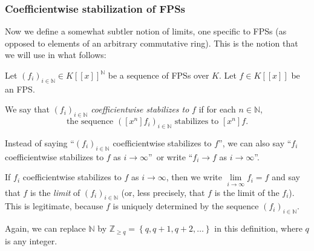 \subsubsection{Coefficientwise stabilization of FPSs}

Now we define a somewhat subtler notion of limits, one specific to FPSs (as
opposed to elements of an arbitrary commutative ring). This is the notion that
we will use in what follows:

\begin{definition}
\label{def.fps.lim.coeff-stab}Let $\left(  f_{i}\right)  _{i\in\mathbb{N}}\in
K\left[  \left[  x\right]  \right]  ^{\mathbb{N}}$ be a sequence of FPSs over
$K$. Let $f\in K\left[  \left[  x\right]  \right]  $ be an FPS.

We say that $\left(  f_{i}\right)  _{i\in\mathbb{N}}$ \emph{coefficientwise
stabilizes to }$f$ if for each $n\in\mathbb{N}$,%
\[
\text{the sequence }\left(  \left[  x^{n}\right]  f_{i}\right)  _{i\in
\mathbb{N}}\text{ stabilizes to }\left[  x^{n}\right]  f.
\]


Instead of saying \textquotedblleft$\left(  f_{i}\right)  _{i\in\mathbb{N}}$
coefficientwise stabilizes to $f$\textquotedblright, we can also say
\textquotedblleft$f_{i}$ coefficientwise stabilizes to $f$ as $i\rightarrow
\infty$\textquotedblright\ or write \textquotedblleft$f_{i}\rightarrow f$ as
$i\rightarrow\infty$\textquotedblright.

If $f_{i}$ coefficientwise stabilizes to $f$ as $i\rightarrow\infty$, then we
write $\lim\limits_{i\rightarrow\infty}f_{i}=f$ and say that $f$ is the
\emph{limit} of $\left(  f_{i}\right)  _{i\in\mathbb{N}}$ (or, less precisely,
that $f$ is the limit of the $f_{i}$). This is legitimate, because $f$ is
uniquely determined by the sequence $\left(  f_{i}\right)  _{i\in\mathbb{N}}$.

Again, we can replace $\mathbb{N}$ by $\mathbb{Z}_{\geq q}=\left\{
q,q+1,q+2,\ldots\right\}  $ in this definition, where $q$ is any integer.
\end{definition}

